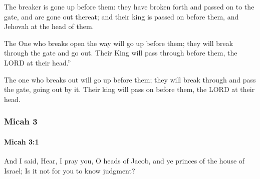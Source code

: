 			\begin{versebox}
					\item[BHS] 
					\item[LXX] 
					\item[ASV] The breaker is gone up before them: they have broken forth and passed on to the gate, and are gone out thereat; and their king is passed on before them, and Jehovah at the head of them.
					\item[NIV] The One who breaks open the way will go up before them; they will break through the gate and go out. Their King will pass through before them, the LORD at their head.”
					\item[NRSV] The one who breaks out will go up before them; they will break through and pass the gate, going out by it. Their king will pass on before them, the LORD at their head.
			\end{versebox}
	\subsubsection{Micah 3} %
		\label{MICAH-3}

		\paragraph{Micah 3:1} %
			\label{MICAH-3-1}

			And I said, Hear, I pray you, O heads of Jacob, and ye princes of the house of Israel; Is it not for you to know judgment?

